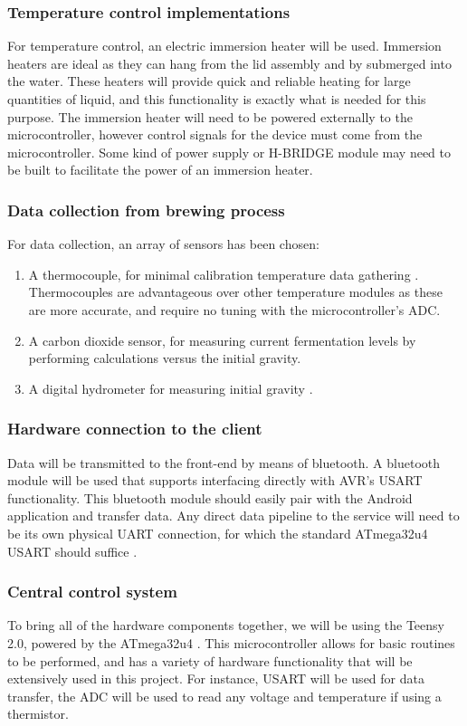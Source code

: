 \documentclass[draftclsnofoot,onecolumn,letterpaper,10pt]{IEEEtran}
\begin{document}
\subsubsection{Temperature control implementations}
For temperature control, an electric immersion heater will be used.
Immersion heaters are ideal as they can hang from the lid assembly and by submerged into the water. \cite{immersion}
These heaters will provide quick and reliable heating for large quantities of liquid, and this functionality is exactly what is needed for this purpose.
The immersion heater will need to be powered externally to the microcontroller, however control signals for the device must come from the
	microcontroller.
Some kind of power supply or H-BRIDGE module may need to be built to facilitate the power of an immersion heater.

\subsubsection{Data collection from brewing process}
For data collection, an array of sensors has been chosen:
\begin{enumerate}
	\item A thermocouple, for minimal calibration temperature data gathering \cite{thermocouple}. Thermocouples are advantageous over other 
		temperature modules as these are more accurate, and require no tuning with the microcontroller's ADC.
	\item A carbon dioxide sensor, for measuring current fermentation levels by performing calculations versus the initial gravity.
	\item A digital hydrometer for measuring initial gravity \cite{makingmead}.
\end{enumerate}
\subsubsection{Hardware connection to the client}
Data will be transmitted to the front-end by means of bluetooth. A bluetooth module will be used that supports interfacing directly with AVR's
USART functionality. This bluetooth module should easily pair with the Android application and transfer data. Any direct data pipeline to the service
will need to be its own physical UART connection, for which the standard ATmega32u4 USART should suffice \cite{datasheet}.

\subsubsection{Central control system}
To bring all of the hardware components together, we will be using the Teensy 2.0, powered by the ATmega32u4 \cite{teensy}.
This microcontroller allows for basic routines to be performed, and has a variety of hardware functionality that will be extensively used in this project.
For instance, USART will be used for data transfer, the ADC will be used to read any voltage and temperature if using a thermistor.
\end{document}
